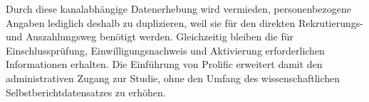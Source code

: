 \begin{neu}
Durch diese kanalabhängige Datenerhebung wird vermieden, personenbezogene Angaben lediglich deshalb zu duplizieren, weil sie für den direkten Rekrutierungs- und Auszahlungsweg benötigt werden. Gleichzeitig bleiben die für Einschlussprüfung, Einwilligungsnachweis und Aktivierung erforderlichen Informationen erhalten. Die Einführung von Prolific erweitert damit den administrativen Zugang zur Studie, ohne den Umfang des wissenschaftlichen Selbstberichtdatensatzes zu erhöhen.
\end{neu}
